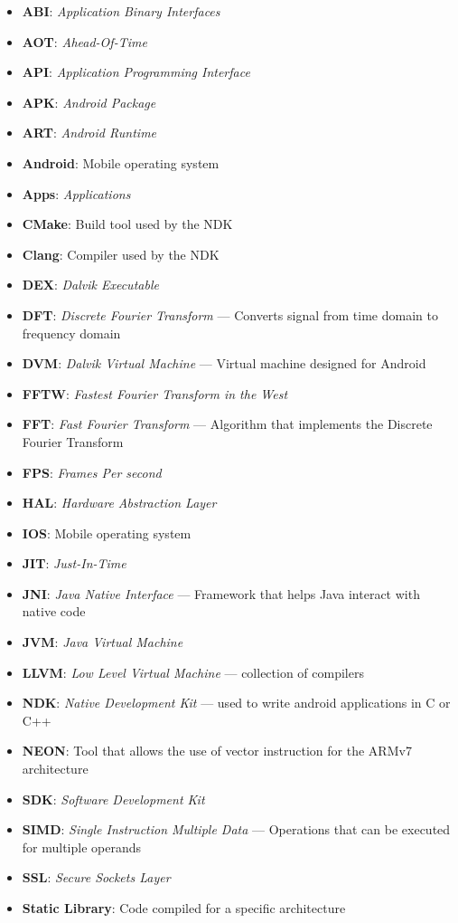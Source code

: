 \begin{itemize}[label={}]
    \item \textbf{ABI}: \emph{Application Binary Interfaces}
    \item \textbf{AOT}: \emph{Ahead-Of-Time}
    \item \textbf{API}: \emph{Application Programming Interface}
    \item \textbf{APK}: \emph{Android Package}
    \item \textbf{ART}: \emph{Android Runtime}
    \item \textbf{Android}: Mobile operating system
    \item \textbf{Apps}: \emph{Applications}
    \item \textbf{CMake}: Build tool used by the NDK
    \item \textbf{Clang}: Compiler used by the NDK
    \item \textbf{DEX}: \emph{Dalvik Executable}
    \item \textbf{DFT}: \textit{Discrete Fourier Transform} --- Converts signal from time domain to frequency domain
    \item \textbf{DVM}: \textit{Dalvik Virtual Machine} --- Virtual machine designed for Android
    \item \textbf{FFTW}: \emph{Fastest Fourier Transform in the West}
    \item \textbf{FFT}: \textit{Fast Fourier Transform} --- Algorithm that implements the Discrete Fourier Transform
    \item \textbf{FPS}: \emph{Frames Per second}
    \item \textbf{HAL}: \emph{Hardware Abstraction Layer}
    \item \textbf{IOS}: Mobile operating system
    \item \textbf{JIT}: \emph{Just-In-Time}
    \item \textbf{JNI}: \textit{Java Native Interface} --- Framework that helps Java interact with native code
    \item \textbf{JVM}: \emph{Java Virtual Machine}
    \item \textbf{LLVM}: \emph{Low Level Virtual Machine} --- collection of compilers
    \item \textbf{NDK}: \textit{Native Development Kit} --- used to write android applications in C or C++
    \item \textbf{NEON}: Tool that allows the use of vector instruction for the ARMv7 architecture
    \item \textbf{SDK}: \emph{Software Development Kit}
    \item \textbf{SIMD}: \textit{Single Instruction Multiple Data} --- Operations that can be executed for multiple operands
    \item \textbf{SSL}: \emph{Secure Sockets Layer}
    \item \textbf{Static Library}: Code compiled for a specific architecture
\end{itemize}
